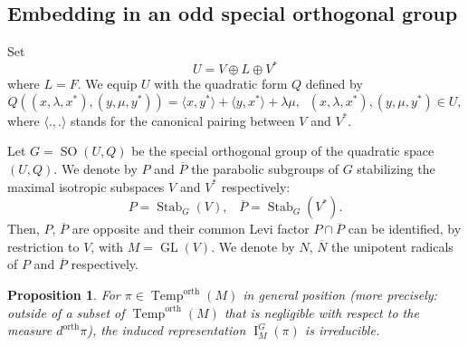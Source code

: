 \documentclass[12pt]{article}
\newtheorem{prop}{Proposition}[section]
\numberwithin{equation}{section}
\DeclareMathOperator{\orth}{orth}
\DeclareMathOperator{\Temp}{Temp}
\DeclareMathOperator{\Stab}{Stab}
\DeclareMathOperator{\GL}{\mathrm{GL}}
\DeclareMathOperator{\SO}{\mathrm{SO}}
\DeclareMathOperator{\rI}{\mathrm{I}}
\begin{document}
	\subsection{Embedding in an odd special orthogonal group}
	Set
	$$\displaystyle U=V\oplus L\oplus V^*$$
	where $L=F$. We equip $U$ with the quadratic form $Q$ defined by
	$$\displaystyle Q((x,\lambda,x^*),(y,\mu,y^*))=\langle x,y^*\rangle+\langle y,x^*\rangle +\lambda\mu,\;\; (x,\lambda,x^*),(y,\mu,y^*)\in U,$$
	where $\langle .,.\rangle$ stands for the canonical pairing between $V$ and $V^*$.
	
	Let $G=\SO(U,Q)$ be the special orthogonal group of the quadratic space $(U,Q)$. We denote by $P$ and $\overline{P}$ the parabolic subgroups of $G$ stabilizing the maximal isotropic subspaces $V$ and $V^*$ respectively:
	$$\displaystyle P=\Stab_G(V),\;\;\; \overline{P}=\Stab_G(V^*).$$
	Then, $P$, $\overline{P}$ are opposite and their common Levi factor $P\cap \overline{P}$ can be identified, by restriction to $V$, with $M=\GL(V)$. We denote by $N$, $\overline{N}$ the unipotent radicals of $P$ and $\overline{P}$ respectively.
	
	\begin{prop}\label{prop irred generic}
	For $\pi\in \Temp^{\orth}(M)$ in general position (more precisely: outside of a subset of $\Temp^{\orth}(M)$ that is negligible with respect to the measure $d^{\orth}\pi$), the induced representation $\rI_M^G(\pi)$ is irreducible.
	\end{prop}
	
\end{document}
